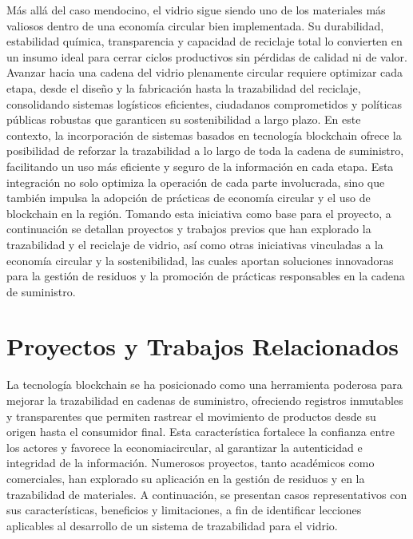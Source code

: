 Más allá del caso mendocino, el vidrio sigue siendo uno de los materiales más valiosos dentro de una economía circular bien implementada. Su durabilidad, estabilidad química, transparencia y capacidad de reciclaje total lo convierten en un insumo ideal para cerrar ciclos productivos sin pérdidas de calidad ni de valor. Avanzar hacia una cadena del vidrio plenamente circular requiere optimizar cada etapa, desde el diseño y la fabricación hasta la trazabilidad del reciclaje, consolidando sistemas logísticos eficientes, ciudadanos comprometidos y políticas públicas robustas que garanticen su \gls{sostenibilidad} a largo plazo. En este contexto, la incorporación de sistemas basados en tecnología blockchain ofrece la posibilidad de reforzar la trazabilidad a lo largo de toda la cadena de suministro, facilitando un uso más eficiente y seguro de la información en cada etapa. Esta integración no solo optimiza la operación de cada parte involucrada, sino que también impulsa la adopción de prácticas de economía circular y el uso de blockchain en la región. Tomando esta iniciativa como base para el proyecto, a continuación se detallan proyectos y trabajos previos que han explorado la trazabilidad y el reciclaje de vidrio, así como otras iniciativas vinculadas a la economía circular y la sostenibilidad, las cuales aportan soluciones innovadoras para la gestión de residuos y la promoción de prácticas responsables en la cadena de suministro.

\section{Proyectos y Trabajos Relacionados}
\label{sec:related-work}

La tecnología blockchain se ha posicionado como una herramienta poderosa para mejorar la \gls{trazabilidad} en cadenas de suministro, ofreciendo registros inmutables y transparentes que permiten rastrear el movimiento de productos desde su origen hasta el consumidor final. Esta característica fortalece la confianza entre los actores y favorece la \gls{economiacircular}, al garantizar la autenticidad e integridad de la información. Numerosos proyectos, tanto académicos como comerciales, han explorado su aplicación en la gestión de residuos y en la trazabilidad de materiales. A continuación, se presentan casos representativos con sus características, beneficios y limitaciones, a fin de identificar lecciones aplicables al desarrollo de un sistema de trazabilidad para el vidrio.

